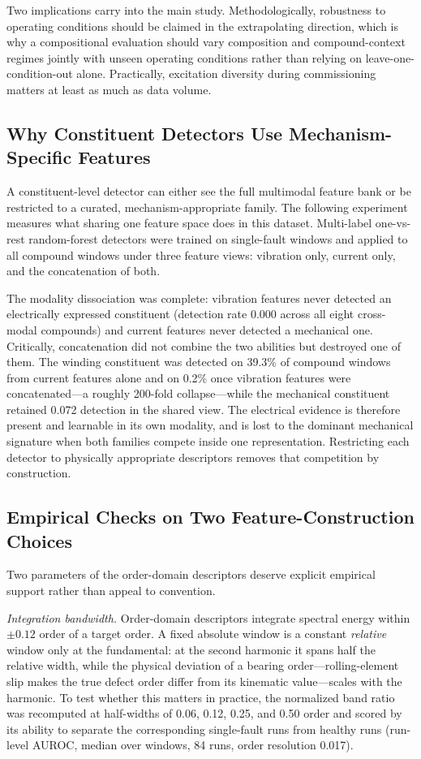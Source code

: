 \documentclass[journal]{IEEEtran}
\begin{document}
Two implications carry into the main study. Methodologically, robustness to
operating conditions should be claimed in the extrapolating direction, which
is why a compositional evaluation should vary composition and compound-context
regimes jointly with unseen operating conditions rather than relying on
leave-one-condition-out alone. Practically, excitation
diversity during commissioning matters at least as much as data volume.

\subsection{Why Constituent Detectors Use Mechanism-Specific Features}
\label{app:modality}

A constituent-level detector can either see the full multimodal feature bank
or be restricted to a curated, mechanism-appropriate family. The following
experiment measures what sharing one feature space does in this dataset. Multi-label one-vs-rest random-forest detectors were trained on
single-fault windows and applied to all compound windows under three feature
views: vibration only, current only, and the concatenation of both.

The modality dissociation was complete: vibration features never detected an
electrically expressed constituent (detection rate 0.000 across all eight
cross-modal compounds) and current features never detected a mechanical one.
Critically, concatenation did not combine the two abilities but destroyed one
of them. The winding constituent was detected on 39.3\% of compound windows
from current features alone and on 0.2\% once vibration features were
concatenated---a roughly 200-fold collapse---while the mechanical constituent
retained 0.072 detection in the shared view. The electrical evidence is
therefore present and learnable in its own modality, and is lost to the
dominant mechanical signature when both families compete inside one
representation. Restricting each detector to physically appropriate
descriptors removes that competition by construction.

\subsection{Empirical Checks on Two Feature-Construction Choices}
\label{app:featurephysics}

Two parameters of the order-domain descriptors deserve explicit empirical
support rather than appeal to convention.

\emph{Integration bandwidth.} Order-domain descriptors integrate spectral
energy within $\pm0.12$ order of a target order. A fixed absolute window is a
constant \emph{relative} window only at the fundamental: at the second
harmonic it spans half the relative width, while the physical deviation of a
bearing order---rolling-element slip makes the true defect order differ from
its kinematic value---scales with the harmonic. To test whether this matters
in practice, the normalized band ratio was recomputed at half-widths of 0.06,
0.12, 0.25, and 0.50 order and scored by its ability to separate the
corresponding single-fault runs from healthy runs (run-level AUROC, median
over windows, 84 runs, order resolution 0.017).
\end{document}
